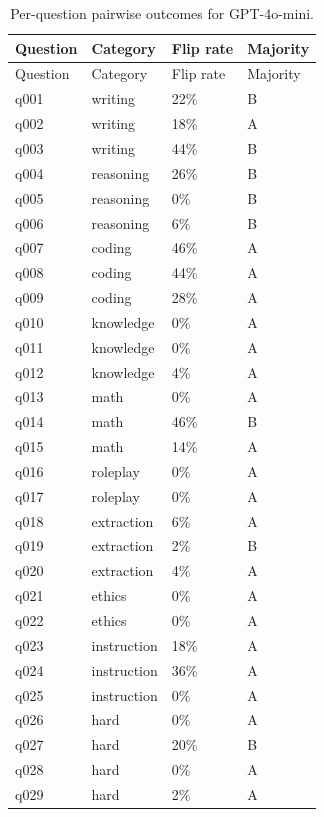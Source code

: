 \documentclass{ijclclp}
\begin{document}
\begin{longtable}{llll}
\caption{Per-question pairwise outcomes for GPT-4o-mini.}\label{tab:perq_4omini}\\
\toprule
Question & Category & Flip rate & Majority \\
\midrule
\endfirsthead
\toprule
Question & Category & Flip rate & Majority \\
\midrule
\endhead
q001 & writing & 22\% & B \\
q002 & writing & 18\% & A \\
q003 & writing & 44\% & B \\
q004 & reasoning & 26\% & B \\
q005 & reasoning & 0\% & B \\
q006 & reasoning & 6\% & B \\
q007 & coding & 46\% & A \\
q008 & coding & 44\% & A \\
q009 & coding & 28\% & A \\
q010 & knowledge & 0\% & A \\
q011 & knowledge & 0\% & A \\
q012 & knowledge & 4\% & A \\
q013 & math & 0\% & A \\
q014 & math & 46\% & B \\
q015 & math & 14\% & A \\
q016 & roleplay & 0\% & A \\
q017 & roleplay & 0\% & A \\
q018 & extraction & 6\% & A \\
q019 & extraction & 2\% & B \\
q020 & extraction & 4\% & A \\
q021 & ethics & 0\% & A \\
q022 & ethics & 0\% & A \\
q023 & instruction & 18\% & A \\
q024 & instruction & 36\% & A \\
q025 & instruction & 0\% & A \\
q026 & hard & 0\% & A \\
q027 & hard & 20\% & B \\
q028 & hard & 0\% & A \\
q029 & hard & 2\% & A \\
\bottomrule
\end{longtable}
\end{document}
